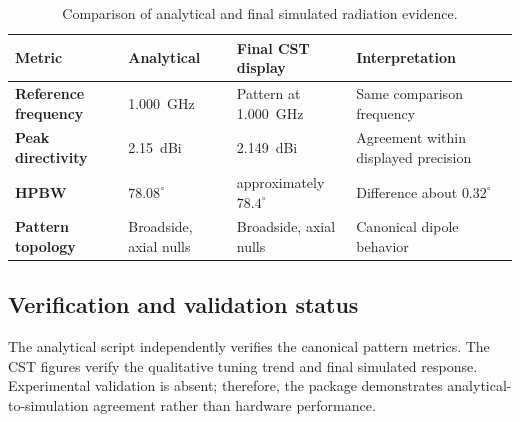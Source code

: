 \begin{table}[H]
\centering
\caption{Comparison of analytical and final simulated radiation evidence.}
\label{tab:analytical-simulation-comparison}
\begin{tabularx}{\textwidth}{>{\bfseries}p{}XXX}
\toprule
Metric & Analytical & Final CST display & Interpretation \\
\midrule
Reference frequency & \SI{1.000}{GHz} & Pattern at \SI{1.000}{GHz} & Same comparison frequency \\
Peak directivity & \SI{2.15}{dBi} & \SI{2.149}{dBi} & Agreement within displayed precision \\
HPBW & $78.08^\circ$ & approximately $78.4^\circ$ & Difference about $0.32^\circ$ \\
Pattern topology & Broadside, axial nulls & Broadside, axial nulls & Canonical dipole behavior \\
\bottomrule
\end{tabularx}
\end{table}

\subsection{Verification and validation status}
The analytical script independently verifies the canonical pattern metrics. The CST
figures verify the qualitative tuning trend and final simulated response. Experimental
validation is absent; therefore, the package demonstrates analytical-to-simulation
agreement rather than hardware performance.
